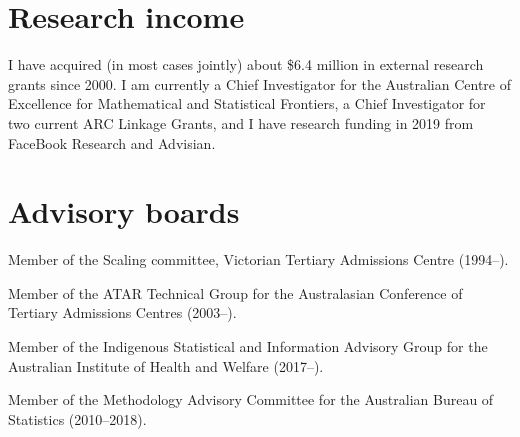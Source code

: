 \documentclass[a4paper,10pt]{article}
\begin{document}
\section{Research income}

I have acquired (in most cases jointly) about \$6.4 million in external research grants since 2000. I am currently a Chief Investigator for the Australian Centre of Excellence for Mathematical and Statistical Frontiers,  a Chief Investigator for two current ARC Linkage Grants, and I have research funding in 2019 from FaceBook Research and Advisian.

\section{Advisory boards}

\begin{compactitem}
\item
  Member of the Scaling committee, Victorian Tertiary Admissions Centre (1994--). %
\item
  Member of the ATAR Technical Group for the Australasian Conference of Tertiary Admissions Centres (2003--).
\item
  Member of the Indigenous Statistical and Information Advisory Group for the Australian Institute of Health and Welfare (2017--).
\item
  Member of the Methodology Advisory Committee for the Australian Bureau of Statistics (2010--2018).
\end{compactitem}


\enlargethispage*{0.9cm}

\setlength{\bibitemsep}{1.8pt}

\end{document}
